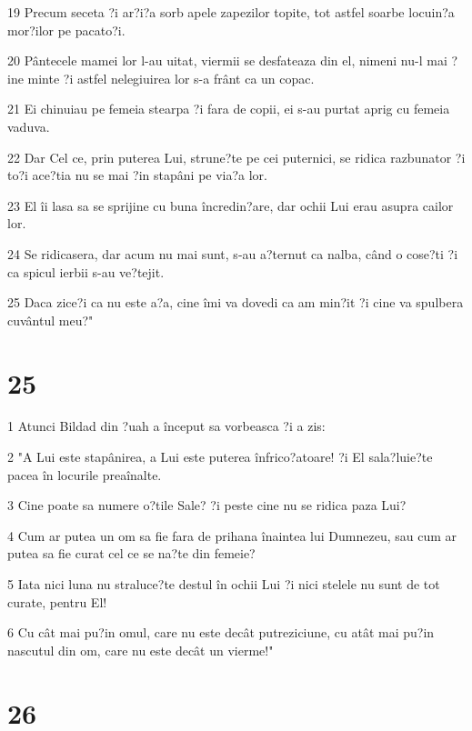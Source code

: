 \par 19 Precum seceta ?i ar?i?a sorb apele zapezilor topite, tot astfel soarbe locuin?a mor?ilor pe pacato?i.
\par 20 Pântecele mamei lor l-au uitat, viermii se desfateaza din el, nimeni nu-l mai ?ine minte ?i astfel nelegiuirea lor s-a frânt ca un copac.
\par 21 Ei chinuiau pe femeia stearpa ?i fara de copii, ei s-au purtat aprig cu femeia vaduva.
\par 22 Dar Cel ce, prin puterea Lui, strune?te pe cei puternici, se ridica razbunator ?i to?i ace?tia nu se mai ?in stapâni pe via?a lor.
\par 23 El îi lasa sa se sprijine cu buna încredin?are, dar ochii Lui erau asupra cailor lor.
\par 24 Se ridicasera, dar acum nu mai sunt, s-au a?ternut ca nalba, când o cose?ti ?i ca spicul ierbii s-au ve?tejit.
\par 25 Daca zice?i ca nu este a?a, cine îmi va dovedi ca am min?it ?i cine va spulbera cuvântul meu?"

\chapter{25}

\par 1 Atunci Bildad din ?uah a început sa vorbeasca ?i a zis:
\par 2 "A Lui este stapânirea, a Lui este puterea înfrico?atoare! ?i El sala?luie?te pacea în locurile preaînalte.
\par 3 Cine poate sa numere o?tile Sale? ?i peste cine nu se ridica paza Lui?
\par 4 Cum ar putea un om sa fie fara de prihana înaintea lui Dumnezeu, sau cum ar putea sa fie curat cel ce se na?te din femeie?
\par 5 Iata nici luna nu straluce?te destul în ochii Lui ?i nici stelele nu sunt de tot curate, pentru El!
\par 6 Cu cât mai pu?in omul, care nu este decât putreziciune, cu atât mai pu?in nascutul din om, care nu este decât un vierme!"

\chapter{26}

